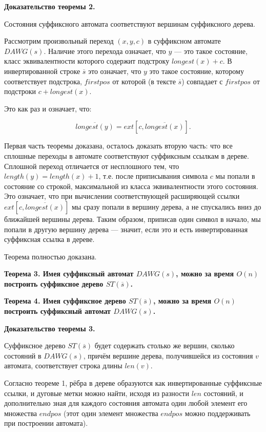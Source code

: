 \bf{Доказательство теоремы 2}.

Состояния суффиксного автомата соответствуют вершинам суффиксного дерева.

Рассмотрим произвольный переход $(x,y,c)$ в суффиксном автомате $DAWG(s)$. Наличие этого перехода означает, что $y$ --- это такое состояние, класс эквивалентности которого содержит подстроку $longest(x) + c$. В инвертированной строке $\overline{s}$ это означает, что $y$ это такое состояние, которому соответствует подстрока, $firstpos$ от которой (в тексте $\overline{s}$) совпадает с $firstpos$ от подстроки $c + \overline{longest(x)}$.

Это как раз и означает, что:

$$ \overline{longest(y)} = ext[c, \overline{longest(x)}]. $$

Первая часть теоремы доказана, осталось доказать вторую часть: что все сплошные переходы в автомате соответствуют суффиксным ссылкам в дереве. Сплошной переход отличается от несплошного тем, что $length(y) = length(x) + 1$, т.е. после приписывания символа $c$ мы попали в состояние со строкой, максимальной из класса эквивалентности этого состояния. Это означает, что при вычислении соответствующей расширяющей ссылки $ext[c, \overline{longest(x)}]$ мы сразу попали в вершину дерева, а не спускались вниз до ближайшей вершины дерева. Таким образом, приписав один символ в начало, мы попали в другую вершину дерева --- значит, если это и есть инвертированная суффиксная ссылка в дереве.

Теорема полностью доказана.

\bf{Теорема 3}. Имея суффиксный автомат $DAWG(s)$, можно за время $O(n)$ построить суффиксное дерево $ST(\overline{s})$.

\bf{Теорема 4}. Имея суффиксное дерево $ST(\overline{s})$, можно за время $O(n)$ построить суффиксный автомат $DAWG(s)$.

\bf{Доказательство теоремы 3}.

Суффиксное дерево $ST(\overline{s})$ будет содержать столько же вершин, сколько состояний в $DAWG(s)$, причём вершине дерева, получившейся из состояния $v$ автомата, соответствует строка длины $len(v)$.

Согласно теореме 1, рёбра в дереве образуются как инвертированные суффиксные ссылки, и дуговые метки можно найти, исходя из разности $len$ состояний, и дополнительно зная для каждого состояния автомата один любой элемент его множества $endpos$ (этот один элемент множества $endpos$ можно поддерживать при построении автомата).

